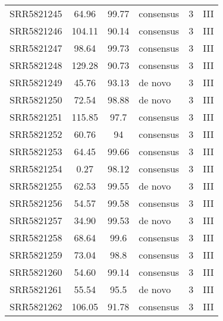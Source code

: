 \begin{scriptsize}
\begin{center}
\begin{longtable}{@{}lcclcc@{}}
SRR5821245 & 64.96         & 99.77       & consensus    & 3        & III      \\
SRR5821246 & 104.11        & 90.14       & consensus    & 3        & III      \\
SRR5821247 & 98.64         & 99.73       & consensus    & 3        & III      \\
SRR5821248 & 129.28        & 90.73       & consensus    & 3        & III      \\
SRR5821249 & 45.76         & 93.13       & de novo      & 3        & III      \\
SRR5821250 & 72.54         & 98.88       & de novo      & 3        & III      \\
SRR5821251 & 115.85        & 97.7        & consensus    & 3        & III      \\
SRR5821252 & 60.76         & 94          & consensus    & 3        & III      \\
SRR5821253 & 64.45         & 99.66       & consensus    & 3        & III      \\
SRR5821254 & 0.27          & 98.12       & consensus    & 3        & III      \\
SRR5821255 & 62.53         & 99.55       & de novo      & 3        & III      \\
SRR5821256 & 54.57         & 99.58       & consensus    & 3        & III      \\
SRR5821257 & 34.90         & 99.53       & de novo      & 3        & III      \\
SRR5821258 & 68.64         & 99.6        & consensus    & 3        & III      \\
SRR5821259 & 73.04         & 98.8        & consensus    & 3        & III      \\
SRR5821260 & 54.60         & 99.14       & consensus    & 3        & III      \\
SRR5821261 & 55.54         & 95.5        & de novo      & 3        & III      \\
SRR5821262 & 106.05        & 91.78       & consensus    & 3        & III     
\end{longtable}

\end{center}
\end{scriptsize}